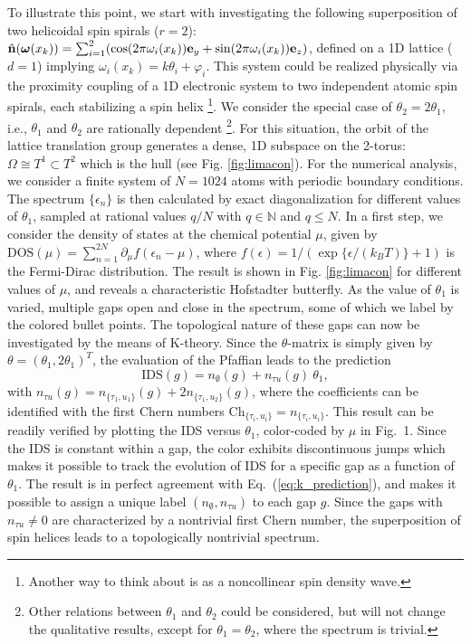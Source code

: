\documentclass[
    10pt,
    aps,
    prl,
    twocolumn,
    floatfix,
    superscriptaddress
]{revtex4-2}
\begin{document}
To illustrate this point, we start with investigating the following superposition of two helicoidal spin spirals ($r=2$):
$\hat{\mathbf{n}}( \boldsymbol{\omega}(x_k ) )
=\sum_{i=1}^{2}( \cos ( 2 \pi \omega_i(x_k) )\mathbf{e}_y
+\sin ( 2 \pi \omega_i(x_k) )\mathbf{e}_z)
$,
defined on a 1D lattice ($d=1$) implying $\omega_i(x_k) = k \theta_i + \varphi_i$. 
This system could be realized physically via the proximity coupling of a 1D electronic system to two independent atomic spin spirals, each stabilizing a spin helix \footnote{Another way to think about is as a noncollinear spin density wave.}.
We consider the special case of $\theta_2 = 2 \theta_1$, i.e., $\theta_1$ and $\theta_2$ are rationally dependent \footnote{Other relations between $\theta_1$ and $\theta_2$ could be considered, but will not change the qualitative results, except for $\theta_1=\theta_2$, where the spectrum is trivial.}.
For this situation, the orbit of the lattice translation group generates a dense, 1D subspace on the 2-torus:  $\Omega \cong T^1 \subset T^2$ which is the hull (see Fig. \ref{fig:limacon}).
For the numerical analysis, we consider a finite system of $N=1024$ atoms with periodic boundary conditions. 
The spectrum $\lbrace \epsilon_n \rbrace$ is then calculated by exact diagonalization for different values of $\theta_1$, sampled at rational values $q/N$ with $q\in \mathbb{N}$ and $q \leq N$.
In a first step, we consider the density of states at the chemical potential $\mu$, given by
$\mathrm{DOS}(\mu) = \sum_{n=1}^{2N} \partial_\mu f( \epsilon_n - \mu)$, where $f(\epsilon) = 1/ ( \exp\lbrace \epsilon / (k_B T) \rbrace + 1 ) $ is the Fermi-Dirac distribution.
The result is shown in Fig. \ref{fig:limacon} for different values of $\mu$, and reveals a characteristic Hofstadter butterfly.
As the value of $\theta_1$ is varied, multiple gaps open and close in the spectrum, some of which we label by the colored bullet points.
The topological nature of these gaps can now be investigated by the means of K-theory.
Since the $\theta$-matrix is simply given by $\theta = (\theta_1, 2\theta_1)^T$, the evaluation of the Pfaffian leads to the prediction
\begin{equation}
    \mathrm{IDS}(g) = n_\emptyset(g) + n_{\tau u}(g)~\theta_1 ,
    \label{eq:k_prediction}
\end{equation}
with $n_{\tau u}(g) =  n_{ \lbrace \tau_1, u_1 \rbrace}(g) + 2 n_{ \lbrace \tau_1, u_2 \rbrace}(g) $, where the coefficients can be identified with the first Chern numbers 
$ \mathrm{Ch}_{ \lbrace \tau_i, u_i \rbrace} = n_{ \lbrace \tau_i, u_i \rbrace}$. 
This result can be readily verified by plotting the IDS versus $\theta_1$, color-coded by $\mu$ in Fig.~1.
Since the IDS is constant within a gap, the color exhibits discontinuous jumps which makes it possible to track the evolution of IDS for a specific gap as a function of $\theta_1$.
The result is in perfect agreement with Eq.~(\ref{eq:k_prediction}), and makes it possible to assign a unique label $(n_\emptyset, n_{\tau u})$ to each gap $g$.
Since the gaps with $n_{\tau u} \neq 0$ are characterized by a nontrivial first Chern number, the superposition of spin helices leads to a topologically nontrivial spectrum.
\end{document}
